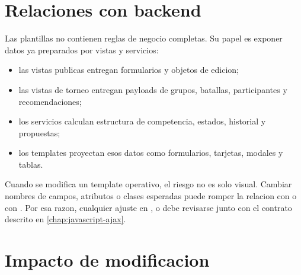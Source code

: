 \section{Relaciones con backend}
\label{sec:frontend-relaciones-backend}

Las plantillas no contienen reglas de negocio completas. Su papel es exponer datos ya preparados por vistas y servicios:

\begin{itemize}
  \item las vistas publicas entregan formularios y objetos de edicion;
  \item las vistas de torneo entregan payloads de grupos, batallas, participantes y recomendaciones;
  \item los servicios calculan estructura de competencia, estados, historial y propuestas;
  \item los templates proyectan esos datos como formularios, tarjetas, modales y tablas.
\end{itemize}

Cuando se modifica un template operativo, el riesgo no es solo visual. Cambiar nombres de campos, atributos  o clases esperadas puede romper la relacion con  o con . Por esa razon, cualquier ajuste en ,  o  debe revisarse junto con el contrato descrito en \cref{chap:javascript-ajax}.

\section{Impacto de modificacion}
\label{sec:frontend-impacto-modificacion}

